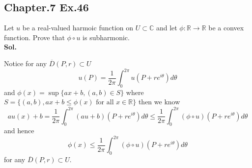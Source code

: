 \documentclass[lang=en,11pt,a4paper,citestyle =authoryear]{elegantpaper}
\newcommand{\R}{\mathbb{R}}
\newcommand{\C}{\mathbb{C}}
\begin{document}
\subsection*{Chapter.7 Ex.46} 
Let $u$ be a real-valued harmoic function on $U\subset \C$ and let $\phi:\R\to\R$ be a convex function. Prove that $\phi\circ u$ is subharmonic.
\vspace{0.5em}\\
\textbf{Sol.} \par
Notice for any $\overline{D}(P,r)\subset U$
\[
u(P) = \dfrac{1}{2\pi} \int_{0}^{2\pi} u(P+re^{i\theta}) d\theta
\]
and $\phi(x) = \sup\{ax+b,(a,b)\in S\}$ where $S = \{(a,b), ax+b \leq \phi(x)\text{ for all }x\in\R\}$ then we know
\[
au(x)+b = \dfrac{1}{2\pi} \int_{0}^{2\pi} (au+b)(P+re^{i\theta}) d\theta \leq \dfrac{1}{2\pi} \int_{0}^{2\pi} (\phi\circ u)(P+re^{i\theta}) d\theta
\]
and hence
\[
\phi(x) \leq \dfrac{1}{2\pi} \int_{0}^{2\pi} (\phi\circ u)(P+re^{i\theta}) d\theta
\]
for any $\overline{D}(P,r) \subset U$.
\vspace{0.5em}
\end{document}
